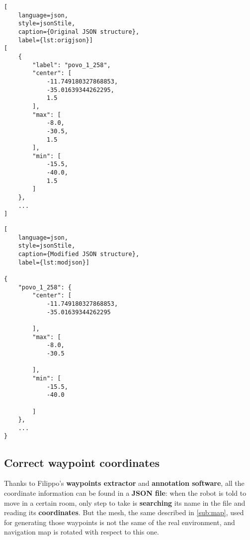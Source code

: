 \noindent\begin{minipage}{0.425\textwidth}
\noindent\begin{lstlisting}[
    language=json,
    style=jsonStile,
    caption={Original JSON structure},
    label={lst:origjson}]
[
    {
        "label": "povo_1_258",
        "center": [
            -11.749180327868853,
            -35.01639344262295,
            1.5
        ],
        "max": [
            -8.0,
            -30.5,
            1.5
        ],
        "min": [
            -15.5,
            -40.0,
            1.5
        ]
    },
    ...
]
\end{lstlisting}
\end{minipage}
\noindent\begin{minipage}{0.15\textwidth}
    \centering
    \noindent{}
\end{minipage}
\noindent\begin{minipage}{0.425\textwidth}
\noindent\begin{lstlisting}[
    language=json,
    style=jsonStile,
    caption={Modified JSON structure},
    label={lst:modjson}]

{
    "povo_1_258": {
        "center": [
            -11.749180327868853,
            -35.01639344262295

        ],
        "max": [
            -8.0,
            -30.5

        ],
        "min": [
            -15.5,
            -40.0

        ]
    },
    ...
}
\end{lstlisting}
\end{minipage}


\subsection*{Correct waypoint coordinates}
\label{sub:waypoints}

Thanks to Filippo's \textbf{waypoints extractor} and  \textbf{annotation software}, all the coordinate information can be found in a \textbf{JSON file}: when the robot is told to move in a certain room, only step to take is \textbf{searching} its name in the file and reading its \textbf{coordinates}.
But the mesh, the same described in \autoref{sub:map}, used for generating those waypoints is not the same of the real environment, and navigation map is rotated with respect to this one.

